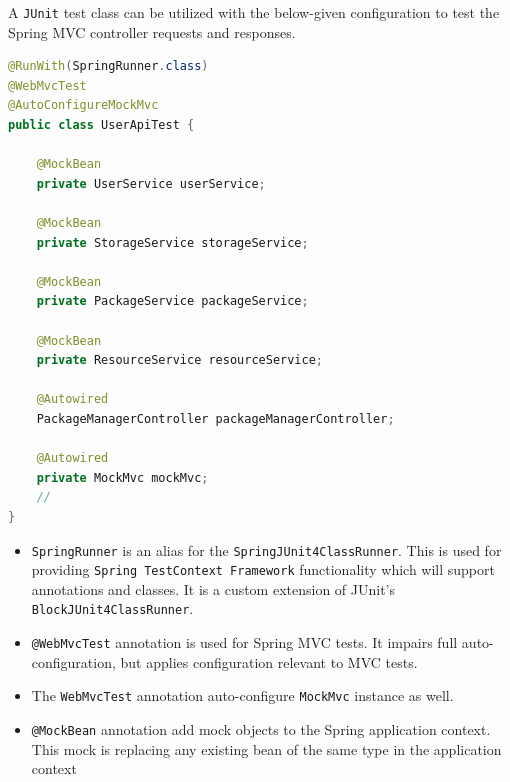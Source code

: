 A \texttt{JUnit} test class can be utilized with the below-given configuration to test the Spring MVC controller requests and responses.

\begin{lstlisting}[language={JAVA}]
@RunWith(SpringRunner.class)
@WebMvcTest
@AutoConfigureMockMvc
public class UserApiTest {

    @MockBean
    private UserService userService;

    @MockBean
    private StorageService storageService;

    @MockBean
    private PackageService packageService;

    @MockBean
    private ResourceService resourceService;

    @Autowired
    PackageManagerController packageManagerController;

    @Autowired
    private MockMvc mockMvc;
    //
}
\end{lstlisting}

\begin{itemize}
    \item \texttt{SpringRunner} is an alias for the \texttt{SpringJUnit4ClassRunner}. This is used for providing \texttt{Spring TestContext Framework} functionality which will support annotations and classes. It is a custom extension of JUnit’s \texttt{BlockJUnit4ClassRunner}.
    \item \texttt{@WebMvcTest} annotation is used for Spring MVC tests. It impairs full auto-configuration, but applies configuration relevant to MVC tests.
    \item The \texttt{WebMvcTest} annotation auto-configure \texttt{MockMvc} instance as well.
    \item  \texttt{@MockBean} annotation add mock objects to the Spring application context. This mock is replacing any existing bean of the same type in the application context
\end{itemize}

